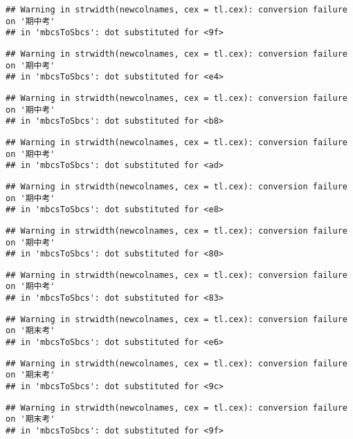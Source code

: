 \documentclass[
]{book}
\begin{document}
\begin{verbatim}
## Warning in strwidth(newcolnames, cex = tl.cex): conversion failure on '期中考'
## in 'mbcsToSbcs': dot substituted for <9f>
\end{verbatim}

\begin{verbatim}
## Warning in strwidth(newcolnames, cex = tl.cex): conversion failure on '期中考'
## in 'mbcsToSbcs': dot substituted for <e4>
\end{verbatim}

\begin{verbatim}
## Warning in strwidth(newcolnames, cex = tl.cex): conversion failure on '期中考'
## in 'mbcsToSbcs': dot substituted for <b8>
\end{verbatim}

\begin{verbatim}
## Warning in strwidth(newcolnames, cex = tl.cex): conversion failure on '期中考'
## in 'mbcsToSbcs': dot substituted for <ad>
\end{verbatim}

\begin{verbatim}
## Warning in strwidth(newcolnames, cex = tl.cex): conversion failure on '期中考'
## in 'mbcsToSbcs': dot substituted for <e8>
\end{verbatim}

\begin{verbatim}
## Warning in strwidth(newcolnames, cex = tl.cex): conversion failure on '期中考'
## in 'mbcsToSbcs': dot substituted for <80>
\end{verbatim}

\begin{verbatim}
## Warning in strwidth(newcolnames, cex = tl.cex): conversion failure on '期中考'
## in 'mbcsToSbcs': dot substituted for <83>
\end{verbatim}

\begin{verbatim}
## Warning in strwidth(newcolnames, cex = tl.cex): conversion failure on '期末考'
## in 'mbcsToSbcs': dot substituted for <e6>
\end{verbatim}

\begin{verbatim}
## Warning in strwidth(newcolnames, cex = tl.cex): conversion failure on '期末考'
## in 'mbcsToSbcs': dot substituted for <9c>
\end{verbatim}

\begin{verbatim}
## Warning in strwidth(newcolnames, cex = tl.cex): conversion failure on '期末考'
## in 'mbcsToSbcs': dot substituted for <9f>
\end{verbatim}
\end{document}
